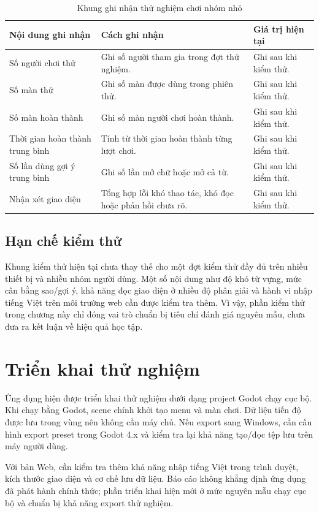 \documentclass[../DoAn.tex]{subfiles}
\begin{document}
\begin{table}[H]
\centering
\small
\begin{tabularx}{\textwidth}{|>{\RaggedRight\arraybackslash}p{4.2cm}|>{\RaggedRight\arraybackslash}p{4.2cm}|>{\RaggedRight\arraybackslash}X|}
\hline
\textbf{Nội dung ghi nhận} & \textbf{Cách ghi nhận} & \textbf{Giá trị hiện tại} \\ \hline
Số người chơi thử & Ghi số người tham gia trong đợt thử nghiệm. & Ghi sau khi kiểm thử. \\ \hline
Số màn thử & Ghi số màn được dùng trong phiên thử. & Ghi sau khi kiểm thử. \\ \hline
Số màn hoàn thành & Ghi số màn người chơi hoàn thành. & Ghi sau khi kiểm thử. \\ \hline
Thời gian hoàn thành trung bình & Tính từ thời gian hoàn thành từng lượt chơi. & Ghi sau khi kiểm thử. \\ \hline
Số lần dùng gợi ý trung bình & Ghi số lần mở chữ hoặc mở cả từ. & Ghi sau khi kiểm thử. \\ \hline
Nhận xét giao diện & Tổng hợp lỗi khó thao tác, khó đọc hoặc phản hồi chưa rõ. & Ghi sau khi kiểm thử. \\ \hline
\end{tabularx}
\caption{Khung ghi nhận thử nghiệm chơi nhóm nhỏ}
\label{table:small_playtest_frame}
\end{table}

\subsection{Hạn chế kiểm thử}

Khung kiểm thử hiện tại chưa thay thế cho một đợt kiểm thử đầy đủ trên nhiều thiết bị và nhiều nhóm người dùng. Một số nội dung như độ khó từ vựng, mức cân bằng sao/gợi ý, khả năng đọc giao diện ở nhiều độ phân giải và hành vi nhập tiếng Việt trên môi trường web cần được kiểm tra thêm. Vì vậy, phần kiểm thử trong chương này chỉ đóng vai trò chuẩn bị tiêu chí đánh giá nguyên mẫu, chưa đưa ra kết luận về hiệu quả học tập.

\section{Triển khai thử nghiệm}
\label{section:4.8}

Ứng dụng hiện được triển khai thử nghiệm dưới dạng project Godot chạy cục bộ. Khi chạy bằng Godot, scene chính  khởi tạo menu và màn chơi. Dữ liệu tiến độ được lưu trong vùng  nên không cần máy chủ. Nếu export sang Windows, cần cấu hình export preset trong Godot 4.x và kiểm tra lại khả năng tạo/đọc tệp lưu trên máy người dùng.

Với bản Web, cần kiểm tra thêm khả năng nhập tiếng Việt trong trình duyệt, kích thước giao diện và cơ chế lưu dữ liệu. Báo cáo không khẳng định ứng dụng đã phát hành chính thức; phần triển khai hiện mới ở mức nguyên mẫu chạy cục bộ và chuẩn bị khả năng export thử nghiệm.
\end{document}

